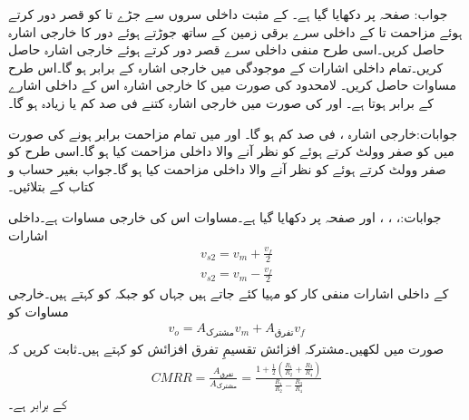 جواب: 
صفحہ  پر   دکھایا گیا ہے۔  کے مثبت داخلی سروں  سے جڑے  تا  کو قصر دور کرتے ہوئے مزاحمت  تا  کے داخلی سرے برقی زمین کے ساتھ جوڑتے ہوئے  دور کا خارجی اشارہ  حاصل کریں۔اسی طرح منفی داخلی سرے  قصر دور کرتے ہوئے خارجی اشارہ  حاصل کریں۔تمام داخلی اشارات  کے موجودگی میں خارجی اشارہ  کے برابر ہو گا۔اس طرح  مساوات   حاصل کریں۔
لامحدود  کی صورت میں  کا خارجی اشارہ اس کے داخلی اشارے کے برابر ہوتا ہے۔ اور
 کی صورت میں خارجی اشارہ کتنے فی صد کم  یا زیادہ ہو گا۔

جوابات:خارجی اشارہ  ،  فی صد کم ہو گا۔
 اور  میں تمام مزاحمت برابر ہونے کی صورت میں   کو صفر وولٹ کرتے ہوئے  کو نظر آنے والا داخلی مزاحمت کیا ہو گا۔اسی طرح   کو صفر وولٹ کرتے ہوئے  کو نظر آنے والا داخلی مزاحمت کیا ہو گا۔جواب بغیر حساب و کتاب کے بتلائیں۔

جوابات:، ، ، اور 
صفحہ  پر  دکھایا گیا ہے۔مساوات  اس کی خارجی مساوات ہے۔داخلی اشارات
\begin{align*}
v_{s2}=v_m+\frac{v_f}{2}\\
v_{s2}=v_m-\frac{v_f}{2}
\end{align*}
کے داخلی اشارات منفی کار کو مہیا کئے جاتے ہیں جہاں  کو  جبکہ  کو  کہتے ہیں۔خارجی مساوات کو
\begin{align}
v_o=A_{\text{مشترک}} v_m +A_{\text{تفرق}} v_f
\end{align}
صورت میں لکھیں۔مشترکہ افزائش تقسیمِ تفرق افزائش کو   کہتے ہیں۔ثابت کریں کہ
\begin{align*}
CMRR=\frac{A_{\text{تفرق}}}{A_{\text{مشترک}}}=\frac{1+\frac{1}{2}\left(\frac{R_1}{R_2}+\frac{R_3}{R_4} \right)}{\frac{R_1}{R_2}-\frac{R_3}{R_4}}
\end{align*}
کے برابر ہے۔

